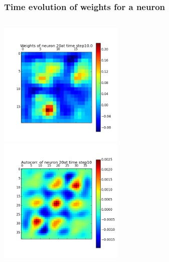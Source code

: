 \begin{frame}
\frametitle{Time evolution of weights for a neuron}
\begin{columns}[t]
\centering
\includegraphics[width=6cm,height=6cm]{neurons/neuron_w_20_t_10.png}\\
\centering
\includegraphics[width=6cm,height=6cm]{neurons/neuron_a_20_t_10.png}\\
\end{columns}
\end{frame}

